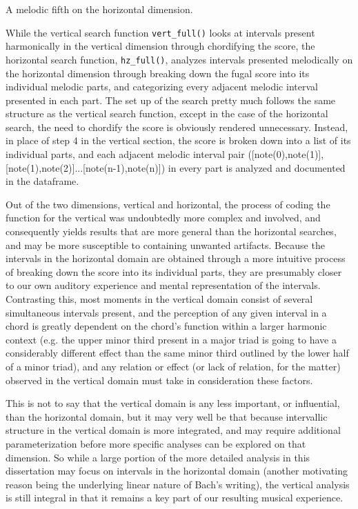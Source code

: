 \begin{Example}[H]
\vspace{1.5em}
    \centering
    \caption{ A melodic fifth on the horizontal dimension. }
\end{Example}    
    While the vertical search function \texttt{vert\_full()} looks at
intervals present harmonically in the vertical dimension through
chordifying the score, the horizontal search function,
\texttt{hz\_full()}, analyzes intervals presented melodically on the
horizontal dimension through breaking down the fugal score into its
individual melodic parts, and categorizing every adjacent melodic
interval presented in each part. The set up of the search pretty much
follows the same structure as the vertical search function, except in
the case of the horizontal search, the need to chordify the score is
obviously rendered unnecessary. Instead, in place of step 4 in the
vertical section, the score is broken down into a list of its individual
parts, and each adjacent melodic interval pair ({[}note(0),note(1){]},
{[}note(1),note(2){]}...{[}note(n-1),note(n){]}) in every part is
analyzed and documented in the dataframe.

Out of the two dimensions, vertical and horizontal, the process of
coding the function for the vertical was undoubtedly more complex and
involved, and consequently yields results that are more general than the
horizontal searches, and may be more susceptible to containing unwanted
artifacts. Because the intervals in the horizontal domain are obtained
through a more intuitive process of breaking down the score into its
individual parts, they are presumably closer to our own auditory
experience and mental representation of the intervals. Contrasting this,
most moments in the vertical domain consist of several simultaneous
intervals present, and the perception of any given interval in a chord
is greatly dependent on the chord's function within a larger harmonic
context (e.g. the upper minor third present in a major triad is going to
have a considerably different effect than the same minor third outlined
by the lower half of a minor triad), and any relation or effect (or lack
of relation, for the matter) observed in the vertical domain must take
in consideration these factors.

This is not to say that the vertical domain is any less important, or
influential, than the horizontal domain, but it may very well be that
because intervallic structure in the vertical domain is more integrated,
and may require additional parameterization before more specific
analyses can be explored on that dimension. So while a large portion of
the more detailed analysis in this dissertation may focus on intervals
in the horizontal domain (another motivating reason being the underlying
linear nature of Bach's writing), the vertical analysis is still
integral in that it remains a key part of our resulting musical
experience.

